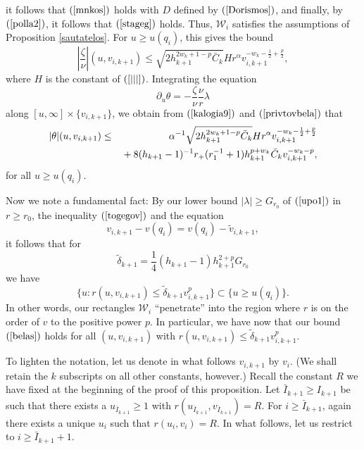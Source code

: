 \documentclass{article}
\newcommand{\zn}{\frac{\zeta}{\nu}}
\begin{document}
it follows that $(\ref{mnkos})$ holds with $D$ defined by $(\ref{Dorismos})$,
and finally, by $(\ref{polla2})$, it follows that $(\ref{stageg})$ holds.
Thus,
$\mathcal{W}_i$ satisfies the assumptions of
Proposition \ref{sautatelos}.
For $u\ge u(q_i)$, this gives the bound
\begin{equation}
\label{privtovbela}
\left|\zn\right|(u,v_{i,k+1})\le \sqrt{2h_{k+1}^{2w_k+1-p}\bar{C}_k}
Hr^\alpha v_{i,k+1}^{-w_k-\frac12+\frac p2},
\end{equation}
where $H$ is the constant of $(\ref{|||})$. 
Integrating the equation
\[
\partial_u\theta=-\zn\frac{\nu}r\lambda
\]
along $[u,\infty]\times\{v_{i,k+1}\}$,
we obtain from $(\ref{kalogia9})$ and $(\ref{privtovbela})$ that
\begin{eqnarray}
\label{belas}
\nonumber
|\theta|(u,v_{i,k+1})&\le&\alpha^{-1}
\sqrt{2h_{k+1}^{2w_k+1-p}\bar{C}_k}Hr^\alpha v_{i,k+1}^{-w_k-\frac12+\frac p2}
\\
&&\hbox{}+8(h_{k+1}-1)^{-1}r_+(r_1^{-1}+1)h_{k+1}^{p+w_k}\bar{C}_k
v_{i,k+1}^{-w_k-p},
\end{eqnarray}
for all $u\ge u(q_i)$.

Now we note a fundamental fact:
By our lower bound $|\lambda|\ge G_{r_0}$ of $(\ref{upo1})$ 
in $r\ge r_0$, the inequality $(\ref{togegov})$
and the equation
\[
v_{i,k+1}-v(q_i)=v(q_i)-\tilde{v}_{i,k+1},
\]
 it follows that 
for 
\[
\tilde{\delta}_{k+1}=\frac14(h_{k+1}-1)h_{k+1}^{2+p}G_{r_0}
\]
we have
\[
\{u:r(u,v_{i,k+1})\le\tilde{\delta}_{k+1}v_{i,k+1}^p\}\subset \{u\ge u(q_i)\}.
\]
In other words, our rectangles $\mathcal{W}_i$ ``penetrate'' 
into the region where $r$
is on the order of $v$ to the positive power $p$.
In particular, we have now that our bound $(\ref{belas})$ holds for
all $(u,v_{i,k+1})$ with $r(u,v_{i,k+1})\le\tilde{\delta}_{k+1}v_{i,k+1}^p$.

To lighten the notation, let us denote in what follows $v_{i, k+1}$ by $v_i$.
(We shall retain the $k$ subscripts on all other constants, however.)
Recall the constant $R$ we have fixed at the beginning of the proof
of this proposition.
Let $\bar{I}_{k+1}\ge I_{k+1}$ be such that there exists
a $u_{\bar{I}_{k+1}}\ge 1$ with $r(u_{\bar{I}_{k+1}},v_{\bar{I}_{k+1}})=R$.
For $i\ge\bar{I}_{k+1}$, again there exists
a unique $u_i$ such that $r(u_i,v_i)=R$. In what follows,
let us restrict to
$i\ge\bar{I}_{k+1}+1$.
\end{document}
